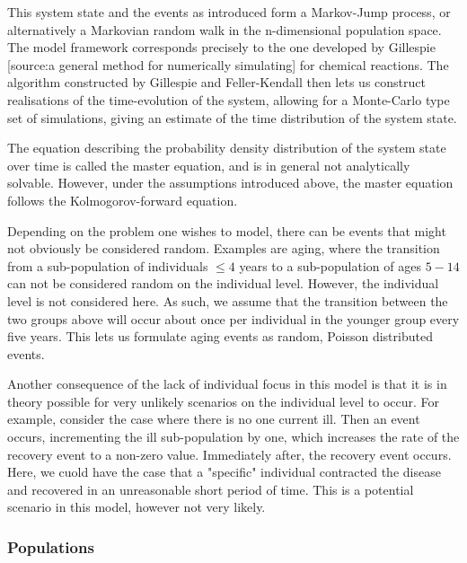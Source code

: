 \documentclass[10pt,a4paper]{article}
\begin{document}
This system state and the events as introduced form a Markov-Jump process, or alternatively a Markovian random walk in the n-dimensional population space. The model framework corresponds precisely to the one developed by Gillespie [source:a general method for numerically simulating] for chemical reactions. The algorithm constructed by Gillespie and Feller-Kendall then lets us construct realisations of the time-evolution of the system, allowing for a Monte-Carlo type set of simulations, giving an estimate of the time distribution of the system state.

The equation describing the probability density distribution of the system state over time is called the master equation, and is in general not analytically solvable. However, under the assumptions introduced above, the master equation follows the Kolmogorov-forward equation.

Depending on the problem one wishes to model, there can be events that might not obviously be considered random. Examples are aging, where the transition from a sub-population of individuals $\leq 4$ years to a sub-population of ages $5-14$ can not be considered random on the individual level. However, the individual level is not considered here. As such, we assume that the transition between the two groups above will occur about once per individual in the younger group every five years. This lets us formulate aging events as random, Poisson distributed events.

Another consequence of the lack of individual focus in this model is that it is in theory possible for very unlikely scenarios on the individual level to occur. For example, consider the case where there is no one current ill. Then an event occurs, incrementing the ill sub-population by one, which increases the rate of the recovery event to a non-zero value. Immediately after, the recovery event occurs. Here, we cuold have the case that a "specific" individual contracted the disease and recovered in an unreasonable short period of time. This is a potential scenario in this model, however not very likely.



\subsubsection{Populations}
\end{document}
